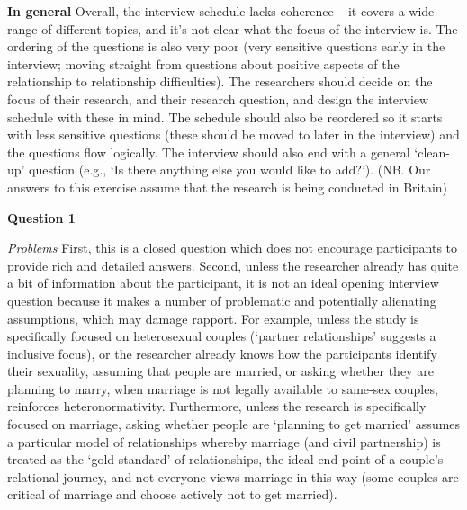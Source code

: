 \documentclass[
  english,
  letterpaper,
  DIV=11,
  numbers=noendperiod]{scrreprt}
\begin{document}
\begin{tcolorbox}[enhanced jigsaw, breakable, bottomtitle=1mm, leftrule=.75mm, opacityback=0, colbacktitle=quarto-callout-caution-color!10!white, opacitybacktitle=0.6, toprule=.15mm, colback=white, left=2mm, coltitle=black, bottomrule=.15mm, titlerule=0mm, title={Show me the solution}, toptitle=1mm, colframe=quarto-callout-caution-color-frame, arc=.35mm, rightrule=.15mm]

\textbf{In general} Overall, the interview schedule lacks coherence --
it covers a wide range of different topics, and it's not clear what the
focus of the interview is. The ordering of the questions is also very
poor (very sensitive questions early in the interview; moving straight
from questions about positive aspects of the relationship to
relationship difficulties). The researchers should decide on the focus
of their research, and their research question, and design the interview
schedule with these in mind. The schedule should also be reordered so it
starts with less sensitive questions (these should be moved to later in
the interview) and the questions flow logically. The interview should
also end with a general `clean-up' question (e.g., `Is there anything
else you would like to add?'). (NB. Our answers to this exercise assume
that the research is being conducted in Britain)

\textbf{Question 1}

\emph{Problems} First, this is a closed question which does not
encourage participants to provide rich and detailed answers. Second,
unless the researcher already has quite a bit of information about the
participant, it is not an ideal opening interview question because it
makes a number of problematic and potentially alienating assumptions,
which may damage rapport. For example, unless the study is specifically
focused on heterosexual couples (`partner relationships' suggests a
inclusive focus), or the researcher already knows how the participants
identify their sexuality, assuming that people are married, or asking
whether they are planning to marry, when marriage is not legally
available to same-sex couples, reinforces heteronormativity.
Furthermore, unless the research is specifically focused on marriage,
asking whether people are `planning to get married' assumes a particular
model of relationships whereby marriage (and civil partnership) is
treated as the `gold standard' of relationships, the ideal end-point of
a couple's relational journey, and not everyone views marriage in this
way (some couples are critical of marriage and choose actively not to
get married).


\end{tcolorbox}
\end{document}
